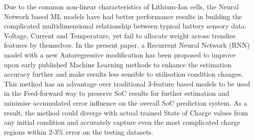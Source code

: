 {    Due to the common non-linear characteristics of Lithium-Ion cells, the Neural Network based ML models have had better performance results in building the complicated multidimensional relationship between typical battery sensory data: Voltage, Current and Temperature, yet fail to allocate weight across trendies features by themselves.
    In the present paper, a Recurrent Neural Network (RNN) model with a new Autoregressive modification has been proposed to improve upon early published Machine Learning methods to enhance the estimation accuracy further and make results less sensible to utilisation condition changes.
    This method has an advantage over traditional 3-feature based models to be used in the Feed-forward way to preserve SoC results for further estimation and minimise accumulated error influence on the overall SoC prediction system.
    As a result, the method could diverge with actual trained State of Charge values from any initial condition and accurately capture even the most complicated charge regions within 2-3\% error on the testing datasets.
}